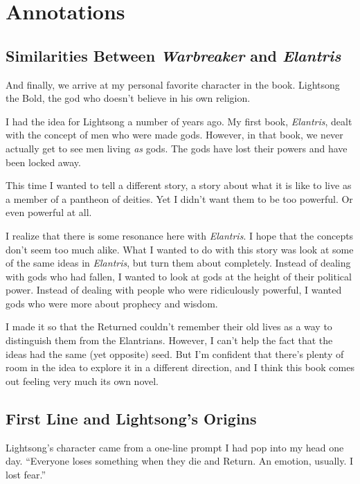 \section*{Annotations}

\subsection*{Similarities Between \textit{Warbreaker} and \textit{Elantris}}

And finally, we arrive at my personal favorite character in the book. Lightsong the Bold, the god who doesn’t believe in his own religion.

I had the idea for Lightsong a number of years ago. My first book, \textit{Elantris}, dealt with the concept of men who were made gods. However, in that book, we never actually get to see men living \textit{as} gods. The gods have lost their powers and have been locked away.

This time I wanted to tell a different story, a story about what it is like to live as a member of a pantheon of deities. Yet I didn’t want them to be too powerful. Or even powerful at all.

I realize that there is some resonance here with \textit{Elantris}. I hope that the concepts don’t seem too much alike. What I wanted to do with this story was look at some of the same ideas in \textit{Elantris}, but turn them about completely. Instead of dealing with gods who had fallen, I wanted to look at gods at the height of their political power. Instead of dealing with people who were ridiculously powerful, I wanted gods who were more about prophecy and wisdom.

I made it so that the Returned couldn’t remember their old lives as a way to distinguish them from the Elantrians. However, I can’t help the fact that the ideas had the same (yet opposite) seed. But I’m confident that there’s plenty of room in the idea to explore it in a different direction, and I think this book comes out feeling very much its own novel.

\subsection*{First Line and Lightsong’s Origins}

Lightsong’s character came from a one-line prompt I had pop into my head one day. “Everyone loses something when they die and Return. An emotion, usually. I lost fear.”

